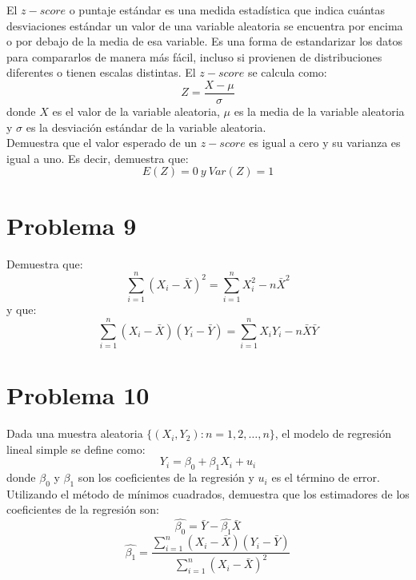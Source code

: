 \documentclass[]{article}
\begin{document}
El $z-score$ o puntaje estándar es una medida estadística que indica cuántas desviaciones estándar un valor de una variable aleatoria se encuentra por encima o por debajo de la media de esa variable. Es una forma de estandarizar los datos para compararlos de manera más fácil, incluso si provienen de distribuciones diferentes o tienen escalas distintas. El $z-score$ se calcula como:
$$
Z=
\frac{X-\mu}{\sigma}
$$
donde $X$ es el valor de la variable aleatoria, $\mu$ es la media de la variable aleatoria y $\sigma$ es la desviación estándar de la variable aleatoria. 
\\
Demuestra que el valor esperado de un $z-score$ es igual a cero y su varianza es igual a uno. Es decir, demuestra que: 
$$
E(Z)=0 \ y \ Var(Z)=1
$$

\section*{Problema 9}

Demuestra que: 
$$
\sum_{i=1}^{n}
(X_i-\bar{X})^2
=
\sum_{i=1}^{n}
X_{i}^{2}
-
n
\bar{X}^2
$$
y que: 
$$
\sum_{i=1}^{n}
(X_i-\bar{X})
(Y_i-\bar{Y})
=
\sum_{i=1}^{n}
X_iY_i
-
n
\bar{X}
\bar{Y}
$$

\section*{Problema 10}

Dada una muestra aleatoria
$\{(X_i, Y_2): n=1,2,\ldots,n\}$, el modelo de regresión lineal simple se define como:
$$
Y_i=
	\beta_0
	+
	\beta_1X_i
	+
	u_i
$$
donde $\beta_0$ y $\beta_1$ son los coeficientes de la regresión y $u_i$ es el término de error. Utilizando el método de mínimos cuadrados, demuestra que los estimadores de los coeficientes de la regresión son:
$$
\hat{\beta_0}=\bar{Y}-\hat{\beta_1}\bar{X}
$$
$$
\hat{\beta_1}
=
\frac
{
	\sum_{i=1}^{n}
	(X_i-\bar{X})
	(Y_i-\bar{Y})
}
{
	\sum_{i=1}^{n}
	(X_i-\bar{X})^2
}
$$
\end{document}
